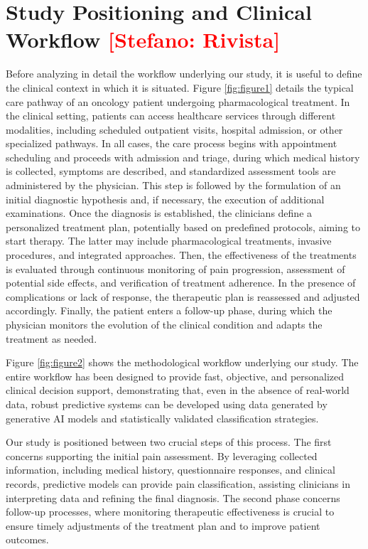 \documentclass[preprint,12pt,authoryear]{elsarticle}
\newcommand{\ste}[1]{\textcolor{red}{[Stefano: #1]}}
\begin{document}
\section{Study Positioning and Clinical Workflow \label{sec:sec3}\ste{Rivista}}
Before analyzing in detail the workflow underlying our study, it is useful to define the clinical context in which it is situated. Figure \ref{fig:figure1} details the typical care pathway of an oncology patient undergoing pharmacological treatment. In the clinical setting, patients can access healthcare services through different modalities, including scheduled outpatient visits, hospital admission, or other specialized pathways. In all cases, the care process begins with appointment scheduling and proceeds with admission and triage, during which medical history is collected, symptoms are described, and standardized assessment tools are administered by the physician. This step is followed by the formulation of an initial diagnostic hypothesis and, if necessary, the execution of additional examinations. Once the diagnosis is established, the clinicians define a personalized treatment plan, potentially based on predefined protocols, aiming to start therapy. The latter may include pharmacological treatments, invasive procedures, and integrated approaches. Then, the effectiveness of the treatments is evaluated through continuous monitoring of pain progression, assessment of potential side effects, and verification of treatment adherence. In the presence of complications or lack of response, the therapeutic plan is reassessed and adjusted accordingly. Finally, the patient enters a follow-up phase, during which the physician monitors the evolution of the clinical condition and adapts the treatment as needed.

Figure \ref{fig:figure2} shows the methodological workflow underlying our study. The entire workflow has been designed to provide fast, objective, and personalized clinical decision support, demonstrating that, even in the absence of real-world data, robust predictive systems can be developed using data generated by generative AI models and statistically validated classification strategies.


\begin{tcolorbox}[colback=verdeMio, colframe=verdeScuro, fonttitle=\bfseries, title=Positioning of the study, fontupper=\setstretch{0.7}]
Our study is positioned between two crucial steps of this process. The first concerns supporting the initial pain assessment. By leveraging collected information, including medical history, questionnaire responses, and clinical records, predictive models can provide pain classification, assisting clinicians in interpreting data and refining the final diagnosis. The second phase concerns follow-up processes, where monitoring therapeutic effectiveness is crucial to ensure timely adjustments of the treatment plan and to improve patient outcomes. 
\end{tcolorbox}
\end{document}
